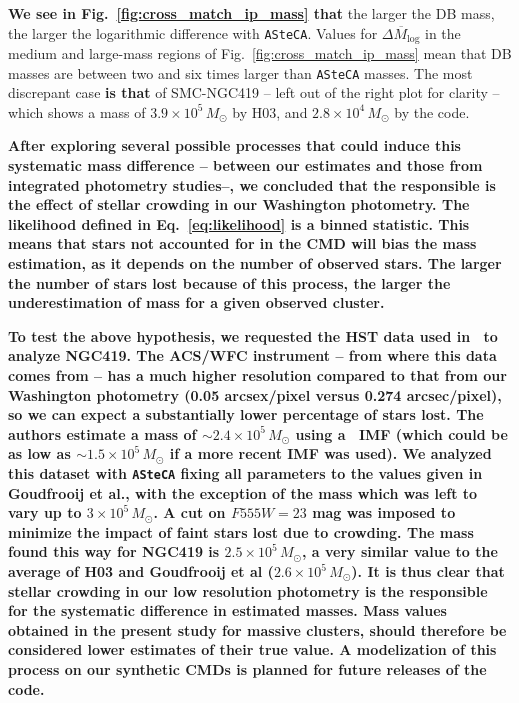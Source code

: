 \documentclass{aa}
\begin{document}
\textbf{We see in Fig.~\ref{fig:cross_match_ip_mass} that}
the larger the DB mass, the larger the logarithmic difference with
\texttt{ASteCA}. Values for $\overline{\Delta M_{\log}}$ in the medium and
large-mass regions of Fig.~\ref{fig:cross_match_ip_mass} mean that DB masses are
between two and six times larger than \texttt{ASteCA} masses.
%
The most discrepant case \textbf{is that} of SMC-NGC419 -- left out of
the right plot for clarity -- which shows a mass of $3.9{\times}10^5\,M_{\odot}$
by H03, and $2.8{\times}10^4\,M_{\odot}$ by the code.

\textbf{
After exploring several possible processes that could induce this systematic
mass difference -- between our estimates and those from integrated photometry
studies--, we concluded that the responsible is the effect of stellar crowding
in our Washington photometry.
%
The likelihood defined in Eq.~\ref{eq:likelihood} is a binned statistic. This
means that stars not accounted for in the CMD will bias the mass estimation,
as it depends on the number of observed stars. The larger the number of stars
lost because of this process, the larger the underestimation of mass for a given
observed cluster.}

\textbf{
To test the above hypothesis, we requested the HST data used
in~\cite{Goudfrooij_2014} to analyze NGC419. The ACS/WFC instrument -- from
where this data comes from -- has a much higher resolution compared to that from
our Washington photometry (0.05 arcsex/pixel versus 0.274 arcsec/pixel), so we
can expect a substantially lower percentage of stars lost.
The authors estimate a mass of ${\sim}2.4{\times}10^5\,M_{\odot}$ using
a~\cite{Salpeter_1955} IMF (which could be as low as
${\sim}1.5{\times}10^5\,M_{\odot}$ if a more recent IMF was used).
We analyzed this dataset with \texttt{ASteCA} fixing all parameters to the
values given in Goudfrooij et al., with the exception of the
mass which was left to vary up to $3{\times}10^5\,M_{\odot}$. A cut on $F555W
{=}23$ mag was imposed to minimize the impact of faint stars lost due to
crowding.
%
The mass found this way for NGC419 is $2.5{\times}10^5\,M_{\odot}$, a
very similar value to the average of H03 and Goudfrooij et al
($2.6{\times}10^5\,M_{\odot}$).
%
It is thus clear that stellar crowding in our low resolution photometry is the
responsible for the systematic difference in estimated masses. Mass values
obtained in the present study for massive clusters, should therefore be
considered lower estimates of their true value. A modelization of this
process on our synthetic CMDs is planned for future releases of the code.}
\end{document}
